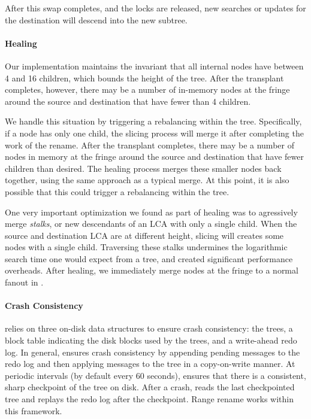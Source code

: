 After this swap completes, and the locks are released,
new searches or updates for the destination will descend into the new subtree.

\paragraph{Healing}  Our \bet implementation maintains the
invariant that all internal nodes have between 4 and 16 children,
which bounds the height of the tree.  After the transplant completes,
however, there may be a number of in-memory \bet nodes at the fringe
around the source and destination that have fewer than 4 children.

We handle this situation by triggering a rebalancing within the tree.
Specifically, if a node has only one child, the slicing process will merge
it after completing the work of the rename.
After the transplant completes, there may be a number
of \bet nodes in memory at the fringe around the
source and destination that have fewer children than desired.
The healing process merges these smaller nodes back together,
using the same approach as a typical \bet merge.  At this point, it is also
possible that this could trigger a rebalancing within the tree.

One very important optimization we found as part of healing was to
agressively merge {\em stalks}, or new descendants of an LCA with
only a single child.
When the source and destination LCA are at different height, slicing
will creates some nodes with a single child.
Traversing these stalks undermines the logarithmic search time one would
expect from a tree, and created significant performance overheads.
After healing, we immediately merge nodes at the fringe
to a normal fanout in \bet.

\paragraph{Crash Consistency} \betrfs relies on three on-disk data structures to
ensure crash consistency: the trees, a block table indicating the disk blocks
used by the trees, and a write-ahead redo log. In general, \betrfs ensures crash
consistency by appending pending messages to the redo log and then applying
messages to the tree in a copy-on-write manner.
At periodic intervals (by default every 60 seconds), \betrfs ensures that there
is a consistent, sharp checkpoint of the tree on disk.
After a crash, \betrfs reads the last checkpointed tree and replays the redo log
after the checkpoint.
Range rename works within this framework.

